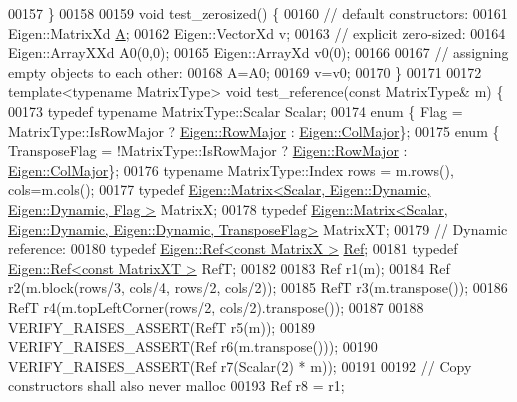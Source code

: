 \begin{DoxyCode}
00157 \}
00158 
00159 \textcolor{keywordtype}{void} test\_zerosized() \{
00160   \textcolor{comment}{// default constructors:}
00161   Eigen::MatrixXd \hyperlink{group___core___module_class_eigen_1_1_matrix}{A};
00162   Eigen::VectorXd v;
00163   \textcolor{comment}{// explicit zero-sized:}
00164   Eigen::ArrayXXd A0(0,0);
00165   Eigen::ArrayXd v0(0);
00166 
00167   \textcolor{comment}{// assigning empty objects to each other:}
00168   A=A0;
00169   v=v0;
00170 \}
00171 
00172 \textcolor{keyword}{template}<\textcolor{keyword}{typename} MatrixType> \textcolor{keywordtype}{void} test\_reference(\textcolor{keyword}{const} MatrixType& m) \{
00173   \textcolor{keyword}{typedef} \textcolor{keyword}{typename} MatrixType::Scalar Scalar;
00174   \textcolor{keyword}{enum} \{ Flag          =  MatrixType::IsRowMajor ? \hyperlink{group__enums_ggaacded1a18ae58b0f554751f6cdf9eb13acfcde9cd8677c5f7caf6bd603666aae3}{Eigen::RowMajor} : 
      \hyperlink{group__enums_ggaacded1a18ae58b0f554751f6cdf9eb13a0cbd4bdd0abcfc0224c5fcb5e4f6669a}{Eigen::ColMajor}\};
00175   \textcolor{keyword}{enum} \{ TransposeFlag = !MatrixType::IsRowMajor ? \hyperlink{group__enums_ggaacded1a18ae58b0f554751f6cdf9eb13acfcde9cd8677c5f7caf6bd603666aae3}{Eigen::RowMajor} : 
      \hyperlink{group__enums_ggaacded1a18ae58b0f554751f6cdf9eb13a0cbd4bdd0abcfc0224c5fcb5e4f6669a}{Eigen::ColMajor}\};
00176   \textcolor{keyword}{typename} MatrixType::Index rows = m.rows(), cols=m.cols();
00177   \textcolor{keyword}{typedef} \hyperlink{group___core___module_class_eigen_1_1_matrix}{Eigen::Matrix<Scalar, Eigen::Dynamic, Eigen::Dynamic, Flag         >}
       MatrixX;
00178   \textcolor{keyword}{typedef} \hyperlink{group___core___module_class_eigen_1_1_matrix}{Eigen::Matrix<Scalar, Eigen::Dynamic, Eigen::Dynamic, TransposeFlag>}
       MatrixXT;
00179   \textcolor{comment}{// Dynamic reference:}
00180   \textcolor{keyword}{typedef} \hyperlink{group___core___module_class_eigen_1_1_ref}{Eigen::Ref<const MatrixX  >} \hyperlink{group___core___module_class_eigen_1_1_ref}{Ref};
00181   \textcolor{keyword}{typedef} \hyperlink{group___core___module_class_eigen_1_1_ref}{Eigen::Ref<const MatrixXT >} RefT;
00182 
00183   Ref r1(m);
00184   Ref r2(m.block(rows/3, cols/4, rows/2, cols/2));
00185   RefT r3(m.transpose());
00186   RefT r4(m.topLeftCorner(rows/2, cols/2).transpose());
00187 
00188   VERIFY\_RAISES\_ASSERT(RefT r5(m));
00189   VERIFY\_RAISES\_ASSERT(Ref r6(m.transpose()));
00190   VERIFY\_RAISES\_ASSERT(Ref r7(Scalar(2) * m));
00191 
00192   \textcolor{comment}{// Copy constructors shall also never malloc}
00193   Ref r8 = r1;

\end{DoxyCode}
